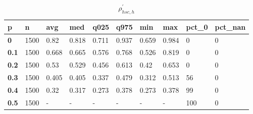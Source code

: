 \begin{table}[h]
 \centering 
\footnotesize
\caption{$\rho_{hsc,h}^\prime $}
\label{tab:alphahsch}
\begin{tabular}[h]{|l|l|l|l|l|l|l|l|l|l|
    } \hline
\textbf{ p} & \textbf{ n} & \textbf{ avg} & \textbf{ med} & \textbf{ q025} & \textbf{ q975} & \textbf{ min} & \textbf{ max} & \textbf{ pct\_0} & \textbf{ pct\_nan}
    \\ \hline
  \textbf{  0} & 1500 &  0.82 & 0.818 & 0.711 & 0.937 & 0.659 & 0.984 &   0 & 0
    \\ \hline
  \textbf{0.1} & 1500 & 0.668 & 0.665 & 0.576 & 0.768 & 0.526 & 0.819 &   0 & 0
    \\ \hline
  \textbf{0.2} & 1500 &  0.53 & 0.529 & 0.456 & 0.613 &  0.42 & 0.653 &   0 & 0
    \\ \hline
  \textbf{0.3} & 1500 & 0.405 & 0.405 & 0.337 & 0.479 & 0.312 & 0.513 &  56 & 0
    \\ \hline
  \textbf{0.4} & 1500 &  0.32 & 0.317 & 0.273 & 0.378 & 0.273 & 0.378 &  99 & 0
    \\ \hline
  \textbf{0.5} & 1500 & - & - & - & - & - & - & 100 & 0
    \\ \hline
 \end{tabular}
 \end{table}
